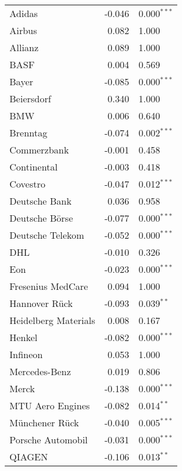 \documentclass[12pt]{article}
\begin{document}
\begin{table} [H]
\begin{tabular*}{\textwidth}{@{\extracolsep{\fill}}lrl}
        Adidas                    & -0.046 &  0.000$^{***}$  \\ 
        Airbus                    &  0.082 &  1.000 \\
        Allianz                   & 0.089  &  1.000 \\
        BASF                      & 0.004  &  0.569\\ 
        Bayer                     & -0.085  & 0.000$^{***}$   \\ 
				Beiersdorf                & 0.340  & 1.000  \\ 
        BMW                       & 0.006  & 0.640  \\ 
      	Brenntag                  & -0.074  &  0.002$^{***}$  \\
      	Commerzbank               & -0.001 &  0.458  \\ 
      	Continental               & -0.003 &  0.418  \\
      	Covestro                  & -0.047 &  0.012$^{***}$   \\
        Deutsche Bank             & 0.036 &  0.958 \\ 
				Deutsche B\"orse          & -0.077 &  0.000$^{***}$ \\ 
     		Deutsche Telekom          & -0.052 &  0.000$^{***}$ \\ 
        DHL                       & -0.010 &  0.326 \\
        Eon                       & -0.023 &  0.000$^{***}$  \\ 
        Fresenius MedCare         & 0.094  & 1.000  \\ 
        Hannover R\"uck           & -0.093 & 0.039$^{**}$   \\
    		Heidelberg Materials      & 0.008 & 0.167  \\ 
    		Henkel                    & -0.082 & 0.000$^{***}$   \\ 
        Infineon                  & 0.053  & 1.000  \\ 
        Mercedes-Benz             & 0.019  & 0.806 \\
        Merck                     & -0.138 & 0.000$^{***}$   \\ 
        MTU Aero Engines          & -0.082 & 0.014$^{**}$  \\ 
        M\"unchener R\"uck        & -0.040  & 0.005$^{***}$ \\ 
        Porsche Automobil         & -0.031 & 0.000$^{***}$   \\ 
        QIAGEN                    & -0.106 & 0.013$^{**}$   \\ 

\end{tabular*}
\end{table}
\end{document}
